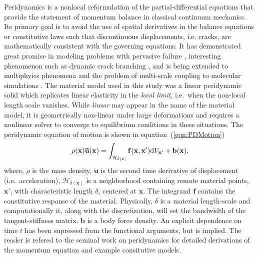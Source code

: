 \documentclass[preprint,12pt]{elsarticle}
\begin{document}
 Peridynamics \cite{silling2000ret,silling:psa,silling2010peridynamic} is a nonlocal reformulation of the partial-differential equations that provide the statement of momentum balance in classical continuum mechanics. Its primary goal is to avoid the use of spatial derivatives in the balance equations or constitutive laws such that discontinuous displacements, i.e. cracks, are mathematically consistent with the governing equations. It has demonstrated great promise in modeling problems with pervasive failure \cite{littlewood2010}, interesting phenomenon such as dynamic crack branching \cite{ha2010sod}, and is being extended to multiphyics phenomena \cite{bobaru2011peridynamic,katiyar2013} and the problem of multi-scale coupling to molecular simulations \cite{seleson2009peridynamics,seleson2014atom,rahman2013b}.  The material model used in this study was a linear peridynamic solid which replicates linear elasticity in the \emph{local limit}, i.e.\ when the non-local length scale vanishes. While \emph{linear} may appear in the name of the material model, it is geometrically non-linear under large deformations and requires a nonlinear solver to converge to equilibrium conditions in these situations.  The peridynamic equation of motion is shown in equation~(\ref{eqn:PDMotion})
%
\begin{equation} 
    \rho(\mathbf{x})\mathbf{\ddot{u}(x)} = \int_{\mathcal{H_{\delta(\mathbf{x})}}} \mathbf{f(x,x'}) {\rm d}V_{\mathbf{x'}} + \mathbf{b(x)},
    \label{eqn:PDMotion}
\end{equation} 
%
where, $\rho$ is the mass density, $\mathbf{\ddot{u}}$ is the second time derivative of displacement (i.e.\ acceleration), $\mathcal{H}_{\delta(\mathbf{x})}$ is a neighborhood containing remote material points, $\mathbf{x'}$, with characteristic length $\delta$, centered at $\mathbf{x}$. The integrand $\mathbf{f}$ contains the constitutive response of the material.  Physically, $\delta$ is a material length-scale and computationally it, along with the discretization, will set the bandwidth of the tangent-stiffness matrix. $\mathbf{b}$ is a body force density.  An explicit dependence on time $t$ has been supressed from the functional arguments, but is implied.  The reader is refered to the seminal work on peridynamics \cite{silling:psa} for detailed derivations of the momentum equation and example consitutive models.
\end{document}
